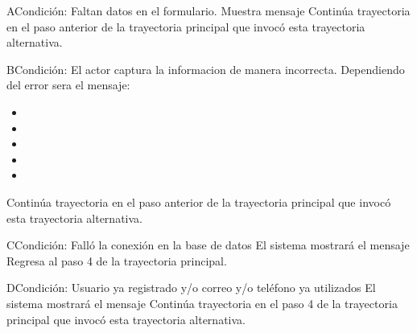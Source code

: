 	\begin{UCtrayectoriaA}{A}{Condición: Faltan datos en el formulario.}
		\UCpaso[\UCsist] Muestra mensaje 
		\UCpaso[\UCsist] Continúa trayectoria en el paso anterior de la trayectoria principal que invocó esta trayectoria alternativa. 
	\end{UCtrayectoriaA}
	\begin{UCtrayectoriaA}{B}{Condición: El actor captura la informacion de manera incorrecta.}
		\UCpaso[\UCsist] Dependiendo del error sera el mensaje:
			\begin{itemize}
			\item {}
			\item {}
			\item {}
			\item {}
			\item {}
			\end{itemize}
		\UCpaso[\UCsist] Continúa trayectoria en el paso anterior de la trayectoria principal que invocó esta trayectoria alternativa. 
	\end{UCtrayectoriaA}
	\begin{UCtrayectoriaA}{C}{Condición: Falló la conexión en la base de datos}
		\UCpaso[\UCsist] El sistema mostrará el mensaje 
		\UCpaso[\UCsist] Regresa al paso 4 de la trayectoria principal. 
	\end{UCtrayectoriaA}
		\begin{UCtrayectoriaA}{D}{Condición: Usuario ya registrado y/o correo y/o teléfono ya utilizados}
			\UCpaso[\UCsist] El sistema mostrará el mensaje 
			\UCpaso[\UCsist] Continúa trayectoria en el paso 4 de la trayectoria  principal que invocó esta trayectoria alternativa. 
	\end{UCtrayectoriaA}
